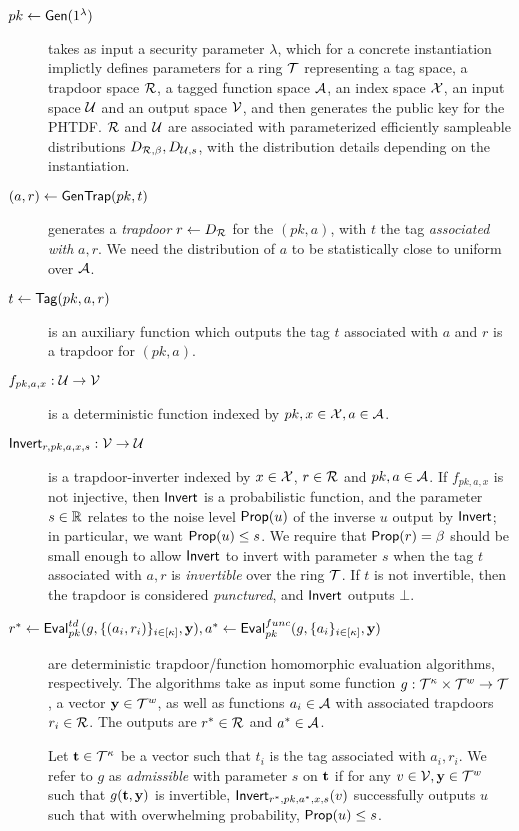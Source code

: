 \begin{description}
\item[$pk \gets \mathsf{Gen}(1^{\lambda})$] takes
  as input a security parameter $\lambda$, which for a concrete
  instantiation implictly defines parameters for a ring $\mathcal{T}$ representing a tag space, a trapdoor space
  $\mathcal{R}$, a tagged function space $\mathcal{A}$, an index space $\mathcal{X}$, an
  input space $\mathcal{U}$ and an output space $\mathcal{V}$, and then generates
  the public key for the PHTDF.  
$\mathcal{R}$ and $\mathcal{U}$ are associated with
  parameterized efficiently sampleable distributions
  $D_{\mathcal{R},\beta}, D_{\mathcal{U},s}$, with the distribution details
  depending on the instantiation. 
\item[$(a,r) \gets \mathsf{GenTrap}(pk,t)$] generates a \emph{trapdoor} $r \gets
  D_{\mathcal{R}}$ for the $(pk,a)$, with $t$ the tag \emph{associated
  with} $a,r$. We need the
  distribution of $a$ to be statistically close to uniform over
  $\mathcal{A}$. 
\item[$t \gets \mathsf{Tag}(pk,a,r)$] is an auxiliary function which
  outputs the tag $t$ associated with $a$ and $r$ is a trapdoor
  for $(pk,a)$. 
\item[$f_{pk,a,x} : \mathcal{U} \to \mathcal{V}$] is a deterministic 
function indexed by $pk,x \in \mathcal{X},a \in \mathcal{A}$. 
\item[$\mathsf{Invert}_{r,pk,a,x,s} : \mathcal{V} \to \mathcal{U}$] is a trapdoor-inverter
  indexed by $x \in \mathcal{X}$, $r \in \mathcal{R}$ and $pk,a \in \mathcal{A}$. If
  $f_{pk,a,x}$ is not injective, then $\mathsf{Invert}$ is a probabilistic
  function, and the parameter $s \in \mathbb{R}$ relates to the noise level $\mathsf{Prop}(u)$ of
  the inverse $u$ output by $\mathsf{Invert}$; in particular, we want
  $\mathsf{Prop}(u) \leq s$. We require that $\mathsf{Prop}(r)=\beta$ should be small
  enough to allow $\mathsf{Invert}$ to invert with parameter $s$ when the tag
  $t$ associated with $a,r$ is \emph{invertible} over the ring
  $\mathcal{T}$. If $t$ is not invertible, then the trapdoor is considered
  \emph{punctured}, and $\mathsf{Invert}$ outputs $\bot$.
\item[$r^* \gets
  \mathsf{Eval}_{pk}^{td}(g,\{(a_i,r_i)\}_{i \in [\kappa]},\mathbf{y}),
  a^* \gets \mathsf{Eval}_{pk}^{func}(g,\{a_i\}_{i \in [\kappa]},\mathbf{y})$] are
  deterministic trapdoor/function homomorphic evaluation algorithms, respectively.
  The algorithms take as input some function $g: \mathcal{T}^{\kappa} \times
  \mathcal{T}^{w} \to
  \mathcal{T}$, a vector $\mathbf{y} \in \mathcal{T}^{w}$, as well as functions $a_i
  \in \mathcal{A}$ with associated trapdoors $r_i \in \mathcal{R}$. The outputs are $r^* \in \mathcal{R}$ and
  $a^* \in \mathcal{A}$.

Let $\mathbf{t} \in \mathcal{T}^{\kappa}$ be a vector
such that $t_i$ is the tag associated with $a_i,r_i$. We refer to $g$ as
  \emph{admissible} with parameter $s$ on $\mathbf{t}$ if for any $v
  \in \mathcal{V},\mathbf{y} \in \mathcal{T}^{w}$ such that $g(\mathbf{t},\mathbf{y})$ is invertible,
$\mathsf{Invert}_{r^*,pk,a^*,x,s}(v)$ successfully outputs $u$ such that with
overwhelming probability, $\mathsf{Prop}(u) \leq s$.
\end{description} 

